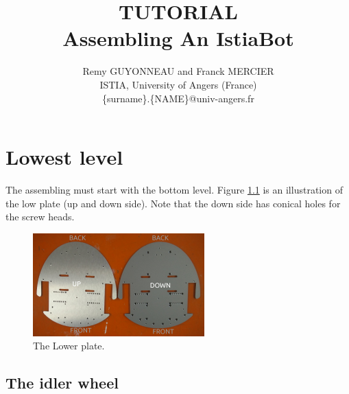 \documentclass[10pt,a4paper]{report}   %
\author{Remy GUYONNEAU and Franck MERCIER\\ISTIA, University of Angers (France)  \\\{surname\}.\{NAME\}@univ-angers.fr}
\title{TUTORIAL\\Assembling An IstiaBot}
\begin{document}
\maketitle

\setcounter{tocdepth}{5}
\tableofcontents

\newpage

\pagestyle{fancy}

\chapter{Lowest level}

The assembling must start with the bottom level. Figure \ref{fig:01} is an illustration of the low plate (up and down side). Note that the down side has conical holes for the screw heads.

\begin{figure}[H]
\center
\includegraphics[width=250px]{images/01.jpg}
\caption{The Lower plate.}
\label{fig:01}
\end{figure}

\section{The idler wheel}
\end{document}
